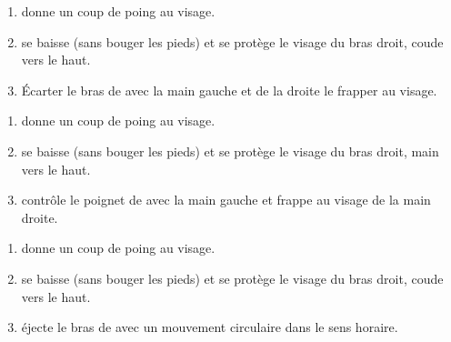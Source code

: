 \begin{exercice}
	\label{mains-nues:ex:enzi-2}

	\begin{enumerate}
		\item \A donne un coup de poing au visage.
		\item \D se baisse (sans bouger les pieds) et se protège le visage du bras droit, coude vers le haut.
		\item Écarter le bras de \A avec la main gauche et de la droite le frapper au visage.
	\end{enumerate}

\end{exercice}


\begin{exercice}
	\label{mains-nues:ex:enzi-3}

	\begin{enumerate}
		\item \A donne un coup de poing au visage.
		\item \D se baisse (sans bouger les pieds) et se protège le visage du bras droit, main vers le haut.
		\item \D contrôle le poignet de \A avec la main gauche et frappe au visage de la main droite.
	\end{enumerate}

\end{exercice}


\begin{exercice}
	\label{mains-nues:ex:enzi-4}

	\begin{enumerate}
		\item \A donne un coup de poing au visage.
		\item \D se baisse (sans bouger les pieds) et se protège le visage du bras droit, coude vers le haut.
		\item \D éjecte le bras de \A avec un mouvement circulaire dans le sens horaire.
	\end{enumerate}

\end{exercice}
\bigskip



